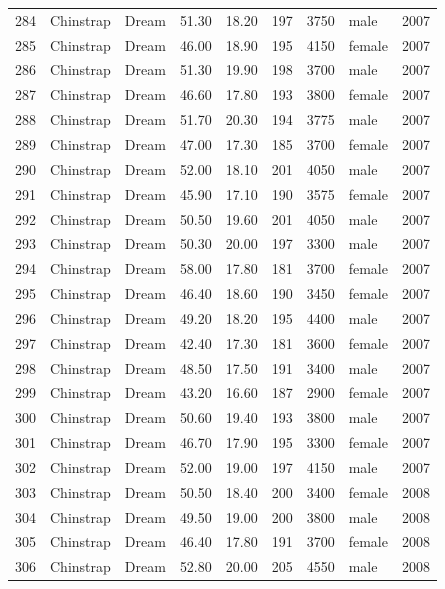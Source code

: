 \documentclass{article}\usepackage[]{graphicx}\usepackage[]{xcolor}
\begin{document}
\begin{table}[ht]
\begin{tabular}{rllrrrrlr}
  284 & Chinstrap & Dream & 51.30 & 18.20 & 197 & 3750 & male & 2007 \\ 
  285 & Chinstrap & Dream & 46.00 & 18.90 & 195 & 4150 & female & 2007 \\ 
  286 & Chinstrap & Dream & 51.30 & 19.90 & 198 & 3700 & male & 2007 \\ 
  287 & Chinstrap & Dream & 46.60 & 17.80 & 193 & 3800 & female & 2007 \\ 
  288 & Chinstrap & Dream & 51.70 & 20.30 & 194 & 3775 & male & 2007 \\ 
  289 & Chinstrap & Dream & 47.00 & 17.30 & 185 & 3700 & female & 2007 \\ 
  290 & Chinstrap & Dream & 52.00 & 18.10 & 201 & 4050 & male & 2007 \\ 
  291 & Chinstrap & Dream & 45.90 & 17.10 & 190 & 3575 & female & 2007 \\ 
  292 & Chinstrap & Dream & 50.50 & 19.60 & 201 & 4050 & male & 2007 \\ 
  293 & Chinstrap & Dream & 50.30 & 20.00 & 197 & 3300 & male & 2007 \\ 
  294 & Chinstrap & Dream & 58.00 & 17.80 & 181 & 3700 & female & 2007 \\ 
  295 & Chinstrap & Dream & 46.40 & 18.60 & 190 & 3450 & female & 2007 \\ 
  296 & Chinstrap & Dream & 49.20 & 18.20 & 195 & 4400 & male & 2007 \\ 
  297 & Chinstrap & Dream & 42.40 & 17.30 & 181 & 3600 & female & 2007 \\ 
  298 & Chinstrap & Dream & 48.50 & 17.50 & 191 & 3400 & male & 2007 \\ 
  299 & Chinstrap & Dream & 43.20 & 16.60 & 187 & 2900 & female & 2007 \\ 
  300 & Chinstrap & Dream & 50.60 & 19.40 & 193 & 3800 & male & 2007 \\ 
  301 & Chinstrap & Dream & 46.70 & 17.90 & 195 & 3300 & female & 2007 \\ 
  302 & Chinstrap & Dream & 52.00 & 19.00 & 197 & 4150 & male & 2007 \\ 
  303 & Chinstrap & Dream & 50.50 & 18.40 & 200 & 3400 & female & 2008 \\ 
  304 & Chinstrap & Dream & 49.50 & 19.00 & 200 & 3800 & male & 2008 \\ 
  305 & Chinstrap & Dream & 46.40 & 17.80 & 191 & 3700 & female & 2008 \\ 
  306 & Chinstrap & Dream & 52.80 & 20.00 & 205 & 4550 & male & 2008 \\ 

\end{tabular}
\end{table}
\end{document}
